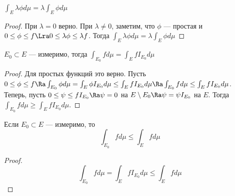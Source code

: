 \begin{proposition}[Однородность]
    \(\int_E \lambda \phi d \mu = \lambda \int_E \phi d  \mu\)
\end{proposition}
\begin{proof}
    При \(\lambda = 0\) верно. При \(\lambda \ne 0\), заметим, что \(\phi\) --- простая и \(0 \le \phi \le f \Lra 0 \le \lambda \phi \le \lambda f\). Тогда \(\int_E \lambda \phi d \mu = \lambda \int_E \phi d  \mu\)
\end{proof}

\begin{proposition}
    \(E_0 \subset E\) --- измеримо, тогда \(\int_{E_0} f d \mu = \int_E f I_{E_0}d \mu\)
\end{proposition}
\begin{proof}
    Для простых функций это верно. Пусть \(0 \le \phi \le f \Ra \int_{E_0} \phi d \mu = \int_E \phi I_{E_0} d \mu \le \int_E f I_{E_0} d\mu \Ra \int_{E_0} f d \mu \le \int_E f I_{E_0} d \mu\). Теперь, пусть \(0 \le \psi \le fI_{E_0} \Ra \psi = 0\) на \(E \setminus E_0 \Ra \psi = \psi I_{E_0}\) на \(E\). Тогда \(\int_{E_0} f d \mu \ge \int_E f I_{E_0}d \mu\).
\end{proof}

\begin{proposition}
    Если \(E_0 \subset E\) --- измеримо, то 
    \[\int_{E_0} f d \mu \le \int_E f d \mu\]
\end{proposition}
\begin{proof}
    \[\int_{E_0} f d \mu = \int_E f I_{E_0} d \mu \le \int_E f d \mu\]
\end{proof}

